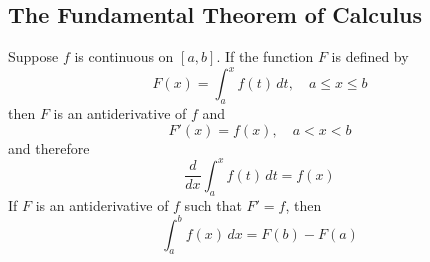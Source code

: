 \subsection{The Fundamental Theorem of Calculus}

\begin{theorem}
    Suppose \(f\) is continuous on \([a,b]\).
    If the function \(F\) is defined by
    \[F(x)=\int_a^xf(t)\,dt,\quad a\leq x\leq b\]
    then \(F\) is an antiderivative of \(f\) and \[F'(x)=f(x),\quad a<x<b\]
    and therefore\[\frac{d}{dx}\int_a^x f(t)\,dt=f(x)\]
    If \(F\) is an antiderivative of \(f\) such that \(F'=f\), then
    \[\int_a^b f(x)\,dx=F(b)-F(a)\]
\end{theorem}